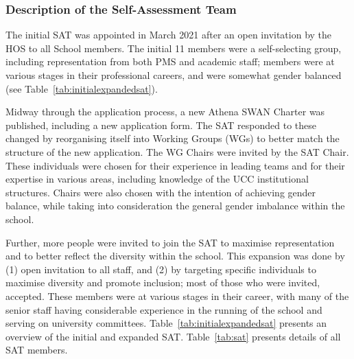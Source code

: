 \subsubsection{Description of the Self-Assessment Team}
The initial SAT  was appointed in March 2021 after an open invitation by the \ac{HOS} to all School members.
The initial 11 members were a self-selecting group, including representation from both PMS and academic staff; members were at various stages in their professional careers, and were somewhat gender balanced (see Table~\ref{tab:initialexpandedsat}).

Midway through the application process, a new Athena SWAN Charter was published, including a new application form. 
The SAT responded to these changed by reorganising itself into Working Groups (WGs) to better match the structure of the new application. The WG Chairs were invited by the SAT Chair. These individuals were chosen for their experience in leading teams and for their expertise in various areas, including knowledge of the UCC institutional structures. Chairs were also chosen with the intention of achieving gender balance, while taking into consideration the general gender imbalance within the school.

Further, more people were invited 
to join the SAT to maximise representation and to better reflect the  diversity within the school. This expansion was done by (1) open invitation to all staff, %
and (2) by targeting specific individuals to maximise diversity and promote inclusion; most of those who were invited, accepted. 
These members were at various stages in their career, with many of the senior staff having considerable experience in the running of the school and serving on university committees.
Table~\ref{tab:initialexpandedsat} presents an overview of the initial and expanded SAT.
Table~\ref{tab:sat} presents details of all SAT members.



